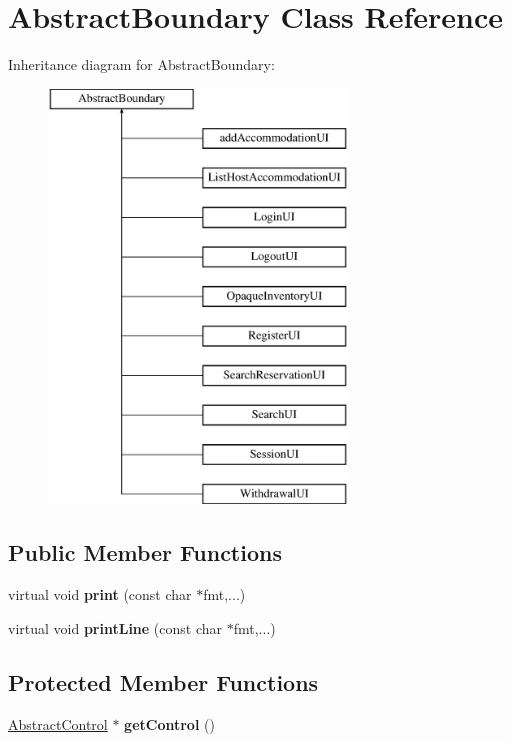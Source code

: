 \hypertarget{class_abstract_boundary}{}\section{Abstract\+Boundary Class Reference}
\label{class_abstract_boundary}
Inheritance diagram for Abstract\+Boundary\+:\begin{figure}[H]
\begin{center}
\leavevmode
\includegraphics[height=11.000000cm]{class_abstract_boundary}
\end{center}
\end{figure}
\subsection*{Public Member Functions}
\begin{DoxyCompactItemize}
\item 
\mbox{\label{class_abstract_boundary_a58d0f5dad1635f64f847d96f3451b145}} 
virtual void {\bfseries print} (const char $\ast$fmt,...)
\item 
\mbox{\label{class_abstract_boundary_a70c2c2983a38d43a6c5ccd6e831d5c5d}} 
virtual void {\bfseries print\+Line} (const char $\ast$fmt,...)
\end{DoxyCompactItemize}
\subsection*{Protected Member Functions}
\begin{DoxyCompactItemize}
\item 
\mbox{\label{class_abstract_boundary_ae5d219b7f0f0941db96fb033469e7593}} 
\mbox{\hyperlink{class_abstract_control}{Abstract\+Control}} $\ast$ {\bfseries get\+Control} ()
\end{DoxyCompactItemize}
